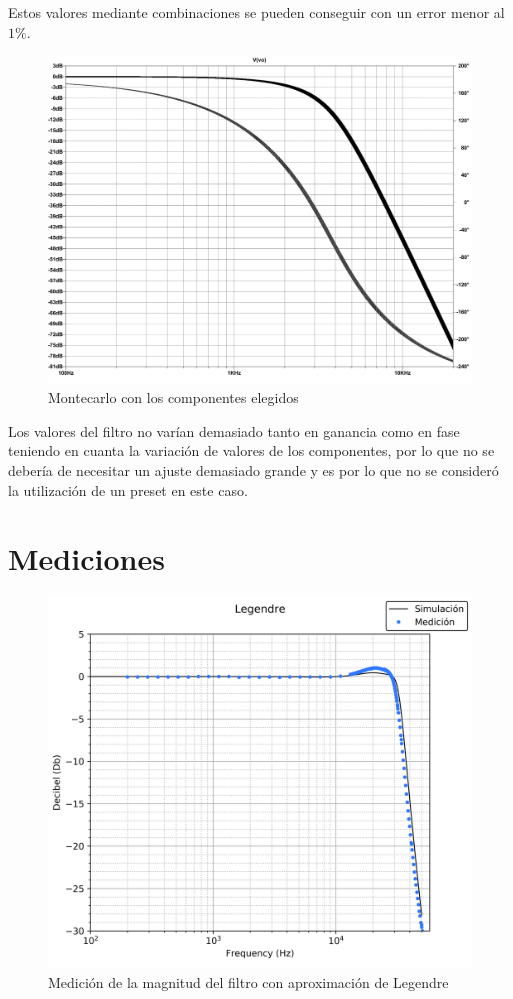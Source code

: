 	Estos valores mediante combinaciones se pueden conseguir con un error menor al $1 \%$.

\begin{figure}[H]
	\centering
	\includegraphics[scale=0.5]{../Ex1/Informe/montecarlobessel.pdf}
	\caption{Montecarlo con los componentes elegidos}
	\label{fig:montecarlobessel}
\end{figure}

	Los valores del filtro no varían demasiado tanto en ganancia como en fase teniendo en cuanta la variación de valores de los componentes, por lo que no se debería de necesitar un ajuste demasiado grande y es por lo que no se consideró la utilización de un preset en este caso.

\section{Mediciones}

\begin{figure}[H]
	\centering
	\includegraphics[scale=0.5,keepaspectratio]{../Ex1/Informe/BodeLegendreMagnitud.png}
	\caption{Medición de la magnitud del filtro con aproximación de Legendre}
	\label{fig:medicionlegendremagnitud}
\end{figure}

